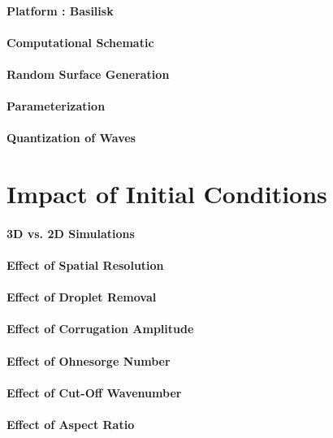 \paragraph{Platform : Basilisk}
\blindtext

\paragraph{Computational Schematic}
\blindtext

\paragraph{Random Surface Generation}
\blindtext

\paragraph{Parameterization}
\blindtext

\paragraph{Quantization of Waves}
\blindtext


\section{Impact of Initial Conditions}

\paragraph{3D vs. 2D Simulations}
\blindtext

\paragraph{Effect of Spatial Resolution}
\blindtext

\paragraph{Effect of Droplet Removal}
\blindtext

\paragraph{Effect of Corrugation Amplitude}
\blindtext

\paragraph{Effect of Ohnesorge Number}
\blindtext

\paragraph{Effect of Cut-Off Wavenumber}
\blindtext

\paragraph{Effect of Aspect Ratio}
\blindtext


